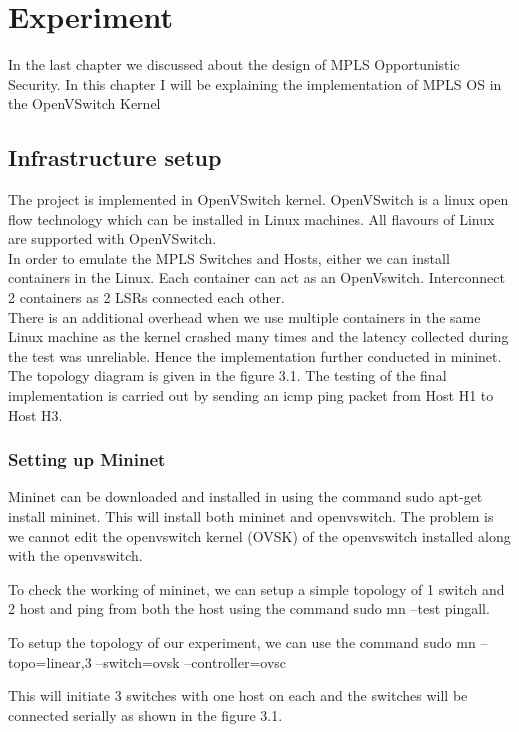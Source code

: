 \chapter{Experiment}
In the last chapter we discussed about the design of MPLS Opportunistic Security. In this chapter I will be explaining the implementation of MPLS OS in the OpenVSwitch Kernel

\section{Infrastructure setup}

The project is implemented in OpenVSwitch kernel. OpenVSwitch is a linux open flow technology which can be installed in Linux machines. All flavours of Linux are supported with OpenVSwitch.\\  

In order to emulate the MPLS Switches and Hosts, either we can install containers in the Linux. Each container can act as an OpenVswitch. Interconnect 2 containers as 2 LSRs connected each other.\\ 

There is an additional overhead when we use multiple containers in the same Linux machine as the kernel crashed many times and the latency collected during the test was unreliable. Hence the implementation further conducted in mininet.\\ 

The topology diagram is given in the figure 3.1. The testing of the final implementation is carried out by sending an icmp ping packet from Host H1 to Host H3.
\subsection{Setting up Mininet}

Mininet can be downloaded and installed in using the command sudo apt-get install mininet. This will install both mininet and openvswitch. The problem is we cannot edit the openvswitch kernel (OVSK) of the openvswitch installed along with the openvswitch. 

To check the working of mininet, we can setup a simple topology of 1 switch and 2 host and ping from both the host using the command sudo mn --test pingall. 

To setup the topology of our experiment, we can use the command sudo mn –topo=linear,3 –switch=ovsk –controller=ovsc 

 
This will initiate 3 switches with one host on each and the switches will be connected serially as shown in the figure 3.1. 

